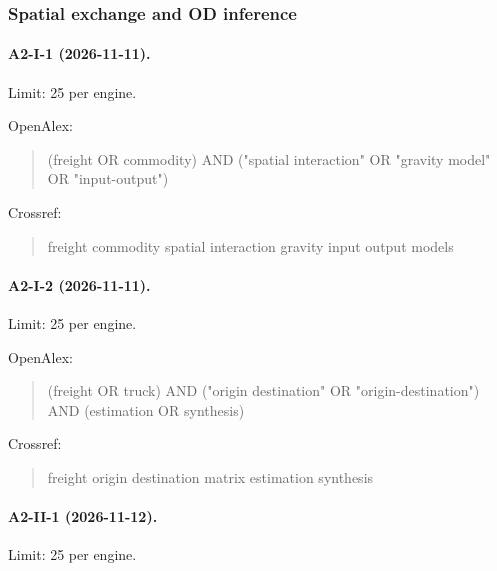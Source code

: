 \subsubsection{Spatial exchange and OD inference}

\paragraph{A2-I-1 (2026-11-11).} Limit: 25 per engine.

\noindent OpenAlex:

\begin{quote}\footnotesize\ttfamily\raggedright

(freight OR commodity) AND ("spatial interaction" OR "gravity model" OR "input-output")

\end{quote}

\noindent Crossref:

\begin{quote}\footnotesize\ttfamily\raggedright

freight commodity spatial interaction gravity input output models

\end{quote}

\paragraph{A2-I-2 (2026-11-11).} Limit: 25 per engine.

\noindent OpenAlex:

\begin{quote}\footnotesize\ttfamily\raggedright

(freight OR truck) AND ("origin destination" OR "origin-destination") AND (estimation OR synthesis)

\end{quote}

\noindent Crossref:

\begin{quote}\footnotesize\ttfamily\raggedright

freight origin destination matrix estimation synthesis

\end{quote}

\paragraph{A2-II-1 (2026-11-12).} Limit: 25 per engine.

